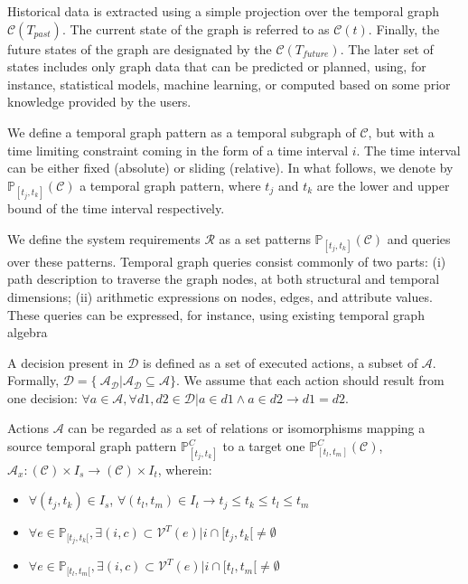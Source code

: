 Historical data is extracted using a simple projection over the temporal graph $\mathcal{C}(T_{past})$. The current state of the graph is referred to as $\mathcal{C}(t)$. Finally, the future states of the graph are designated by the $\mathcal{C}(T_{future})$. The later set of states includes only graph data that can be predicted or planned, using, for instance, statistical models, machine learning, or computed based on some prior knowledge provided by the users.

We define a temporal graph pattern as a temporal subgraph of $\mathcal{C}$, but with a time limiting constraint coming in the form of a time interval $i$. The time interval can be either fixed (absolute) or sliding (relative). In what follows, we denote by $\mathds{P}_{[t_j,t_k]}(\mathcal{C})$ a temporal graph pattern, where $t_j$ and $t_k$ are the lower and upper bound of the time interval respectively.

We define the system requirements $\mathcal{R}$ as a set patterns $\mathds{P}_{[t_j,t_k]}(\mathcal{C})$ and queries over these patterns. Temporal graph queries consist commonly of two parts: (i) path description to traverse the graph nodes, at both structural and temporal dimensions; (ii) arithmetic expressions on nodes, edges, and attribute values.    
These queries can be expressed, for instance, using existing temporal graph algebra~%

A decision present in $\mathcal{D}$ is defined as a set of executed actions, \ie a subset of $\mathcal{A}$.
Formally, $\mathcal{D} = \{\ \mathcal{A_D} | \mathcal{A_D}  \subseteq \mathcal{A}\}$.
We assume that each action should result from one decision: $\forall a \in \mathcal{A}, \forall d1, d2 \in \mathcal{D} | a \in d1 \wedge a \in d2 \rightarrow d1 = d2$.

Actions $\mathcal{A}$ can be regarded as  a set of relations or isomorphisms mapping a source temporal graph pattern $\mathds{P}_{[t_j,t_k]}^{C}$ to a target one $\mathds{P}_{[t_l,t_m]}^{C}(\mathcal{C})$,  $\mathcal{A}_x : (\mathcal{C}) \times I_s \rightarrow (\mathcal{C}) \times I_t$, wherein:

\begin{itemize}
\item $\forall (t_j, t_k) \in I_s$, $\forall (t_l, t_m) \in I_t \rightarrow t_j \leq t_k \leq t_l \leq t_m$
\item $\forall e \in \mathds{P}_{[t_j,t_k[}, \exists (i,c) \subset \mathcal{V}^T (e) | i \cap [t_j,t_k[ \neq \emptyset$  
\item $\forall e \in \mathds{P}_{[t_l,t_m[}, \exists (i,c) \subset \mathcal{V}^T (e) |i \cap [t_l,t_m[ \neq \emptyset$
\end{itemize}

